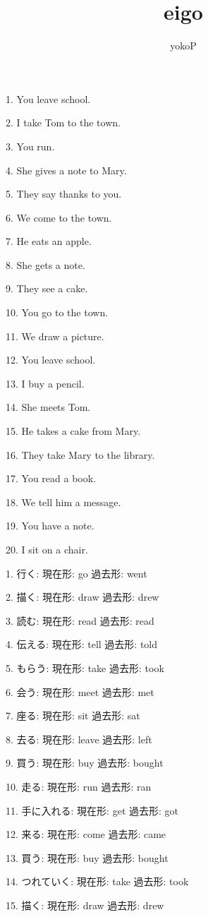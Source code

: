\documentclass[uplatex,
paper=a4,
fontsize=18pt,
jafontsize=16pt,
number_of_lines=30,
line_length=30zh,
baselineskip=25pt,
]{jlreq}
\author{yokoP}
\title{eigo}
\begin{document}
1.  You leave school.

2.  I take Tom to the town.

3.  You run.

4.  She gives a note to Mary.

5.  They say thanks to you.

6.  We come to the town.

7.  He eats an apple.

8.  She gets a note.

9.  They see a cake.

10.  You go to the town.

11.  We draw a picture.

12.  You leave school.

13.  I buy a pencil.

14.  She meets Tom.

15.  He takes a cake from Mary.

16.  They take Mary to the library.

17.  You read a book.

18.  We tell him a message.

19.  You have a note.

20.  I sit on a chair.


\newpage
{}
1.  行く:   現在形: go   過去形: went

2.  描く:   現在形: draw   過去形: drew

3.  読む:   現在形: read   過去形: read

4.  伝える:   現在形: tell   過去形: told

5.  もらう:   現在形: take   過去形: took

6.  会う:   現在形: meet   過去形: met

7.  座る:   現在形: sit   過去形: sat

8.  去る:   現在形: leave   過去形: left

9.  買う:   現在形: buy   過去形: bought

10.  走る:   現在形: run   過去形: ran

11.  手に入れる:   現在形: get   過去形: got

12.  来る:   現在形: come   過去形: came

13.  買う:   現在形: buy   過去形: bought

14.  つれていく:   現在形: take   過去形: took

15.  描く:   現在形: draw   過去形: drew
\end{document}
